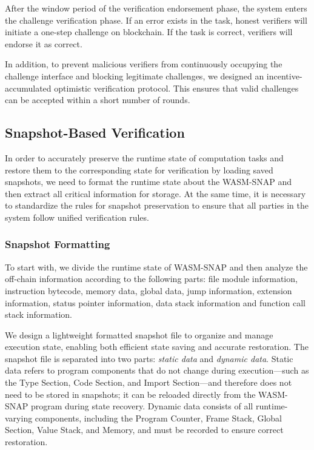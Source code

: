 \documentclass[3p]{elsarticle}
\theoremstyle{remark}
\begin{document}
After the window period of the verification endorsement phase, the system enters the challenge verification phase. If an error exists in the task, honest verifiers will initiate a one-step challenge on blockchain. If the task is correct, verifiers will endorse it as correct.

In addition, to prevent malicious verifiers from continuously occupying the challenge interface and blocking legitimate challenges, we designed an incentive-accumulated optimistic verification protocol. This ensures that valid challenges can be accepted within a short number of rounds.

\subsection{Snapshot-Based Verification}

In order to accurately preserve the runtime state of computation tasks and restore them to the corresponding state for verification by loading saved snapshots, we need to format the runtime state about the WASM-SNAP and then extract all critical information for storage. At the same time, it is necessary to standardize the rules for snapshot preservation to ensure that all parties in the system follow unified verification rules.

\subsubsection{Snapshot Formatting}


To start with, we divide the runtime state of WASM-SNAP and then analyze the off-chain information according to the following parts: file module information, instruction bytecode, memory data, global data, jump information, extension information, status pointer information, data stack information and function call stack information. 

We design a lightweight formatted snapshot file to organize and manage execution state, enabling both efficient state saving and accurate restoration. The snapshot file is separated into two parts: \textit{static data} and \textit{dynamic data}. Static data refers to program components that do not change during execution—such as the Type Section, Code Section, and Import Section—and therefore does not need to be stored in snapshots; it can be reloaded directly from the WASM-SNAP program during state recovery. Dynamic data consists of all runtime-varying components, including the Program Counter, Frame Stack, Global Section, Value Stack, and Memory, and must be recorded to ensure correct restoration.
\end{document}
